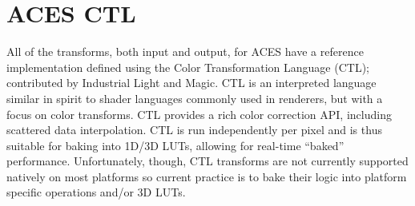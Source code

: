 \section{ACES CTL}%
\label{sec:aces-ctl}

All of the transforms, both input and output, for ACES have a reference implementation defined using the Color Transformation Language (CTL); contributed by Industrial Light and Magic. CTL is an interpreted language similar in spirit to shader languages commonly used in renderers, but with a focus on color transforms. CTL provides a rich color correction API, including scattered data interpolation. CTL is run independently per pixel and is thus suitable for baking into 1D/3D LUTs, allowing for real-time “baked” performance. Unfortunately, though, CTL transforms are not currently supported natively on most platforms so current practice is to bake their logic into platform specific operations and/or 3D LUTs.

